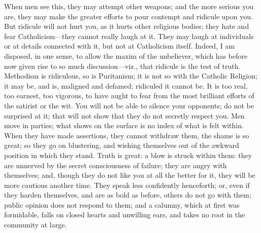 When men see this, they may attempt other weapons; and
the more serious you are, they may make the greater
efforts to pour contempt and ridicule upon you. But
ridicule will not hurt you, as it hurts other religious
bodies; they hate and fear Catholicism—they cannot
really laugh at it. They may laugh at individuals or at
details connected with it, but not at Catholicism itself.
Indeed, I am disposed, in one sense, to allow the maxim
of the unbeliever, which has before now given rise to so
much discussion—viz., that ridicule is the test of
truth. Methodism is ridiculous, so is Puritanism; it is
not so with the Catholic Religion; it may be, and is,
maligned and defamed; ridiculed it cannot be. It is too
real, too earnest, too vigorous, to have aught to fear
from the most brilliant efforts of the satirist or the
wit. You will not be able to silence your opponents; do
not be surprised at it; that will not show that they do
not secretly respect you. Men move in parties; what shows
on the surface is no index of what is felt within. When
they have made assertions, they cannot withdraw them, the
shame is so great; so they go on blustering, and wishing
themselves out of the awkward position in which they
stand. Truth is great: a blow is struck within them: they
are unnerved by the secret consciousness of failure; they
are angry with themselves; and, though they do not like
you at all the better for it, they will be more cautious
another time. They speak less confidently henceforth; or,
even if they harden themselves, and are as bold as
before, others do not go with them; public opinion does
not respond to them; and a calumny, which at first was
formidable, falls on closed hearts and unwilling ears,
and takes no root in the community at large.


